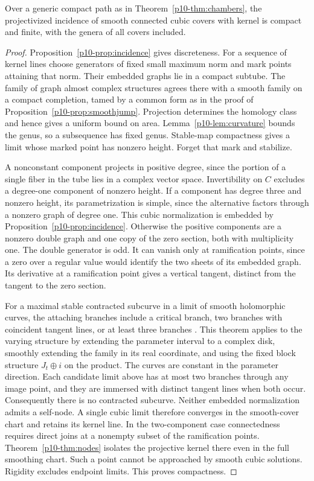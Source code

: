 \begin{proposition}\label{p10-prop:compact}
Over a generic compact path as in Theorem~\ref{p10-thm:chambers}, the
projectivized incidence of smooth connected cubic covers with kernel
is compact and finite, with the genera of all covers included.
\end{proposition}
\begin{proof}
Proposition~\ref{p10-prop:incidence} gives discreteness. For a sequence of
kernel lines choose generators of fixed small maximum norm and mark
points attaining that norm. Their embedded graphs lie in a compact
subtube. The family of graph almost complex structures agrees there
with a smooth family on a compact completion, tamed by a common form
as in the proof of Proposition~\ref{p10-prop:smoothjump}. Projection
determines the homology class and hence gives a uniform bound on
area. Lemma~\ref{p10-lem:curvature} bounds the genus, so a subsequence
has fixed genus. Stable-map compactness gives a limit whose marked
point has nonzero height. Forget that mark and stabilize.

A nonconstant component projects in positive degree, since the
portion of a single fiber in the tube lies in a complex vector space.
Invertibility on $C$ excludes a degree-one component of nonzero
height. If a component has degree three and nonzero height, its
parametrization is simple, since the alternative factors through
a nonzero graph of degree one. This cubic normalization is embedded
by Proposition~\ref{p10-prop:incidence}. Otherwise the positive components
are a nonzero double graph and one copy of the zero section,
both with multiplicity one. The double generator is odd. It can vanish
only at ramification points, since a zero over a regular value would
identify the two sheets of its embedded graph. Its derivative at a
ramification point gives a vertical tangent, distinct from the tangent
to the zero section.

For a maximal stable contracted subcurve in a limit of smooth
holomorphic curves, the attaching branches include a critical branch,
two branches with coincident tangent lines, or at least three
branches \cite[Theorem~1.1]{ekholm}. This theorem applies to the
varying structure by extending the parameter interval to a complex
disk, smoothly extending the family in its real coordinate, and
using the fixed block structure $J_t\oplus i$ on the product.
The curves are constant in the parameter direction. Each candidate
limit above has at most two branches through any image point, and
they are immersed with distinct tangent lines when both occur.
Consequently there is no contracted subcurve. Neither embedded
normalization admits a self-node. A single cubic limit therefore
converges in the smooth-cover chart and retains its kernel line.
In the two-component case connectedness requires direct joins at a
nonempty subset of the ramification points. Theorem~\ref{p10-thm:nodes}
isolates the projective kernel there even in the full smoothing
chart. Such a point cannot be approached by smooth cubic solutions.
Rigidity excludes endpoint limits. This proves compactness.
\end{proof}

